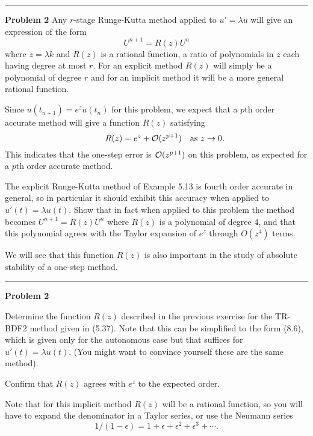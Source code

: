 \documentclass[10pt]{article}
\begin{document}


\vskip 1cm
\hrule
{\bf Problem 2}
Any $r$-stage Runge-Kutta method applied to $u'=\lambda u$ will give an
expression of the form
\[
U^{n+1} = R(z)U^n
\]
where $z=\lambda k$ and $R(z)$ is a rational function, a ratio of
polynomials in $z$ each having degree at most $r$.  For an explicit method
$R(z)$ will simply be a polynomial of degree $r$ and for an implicit method
it will be a more general rational function.

Since $u(t_{n+1}) = e^z u(t_n)$ for this problem, we expect that a $p$th
order accurate method will give a function $R(z)$ satisfying
\[
\qquad  R(z) = e^z + {\mathcal O}(z^{p+1}) \quad\text{as}~z \rightarrow 0.
\]
This indicates that the one-step error is ${\mathcal O}(z^{p+1})$ on this problem,
as expected for a $p$th order accurate method.

The explicit
Runge-Kutta method of Example 5.13 is fourth order accurate in general,
so in particular it should exhibit this accuracy when applied to 
$u'(t) = \lambda u(t)$.  Show that in fact when applied to this
problem the method becomes $U^{n+1} = R(z)U^n$ where $R(z)$ is 
a polynomial of degree 4, and that this polynomial agrees with the Taylor
expansion of $e^z$ through $O(z^4)$ terms.

We will see that this function $R(z)$ is also important in the study of 
absolute stability of a one-step method.



\vskip 1cm
\hrule
{\bf Problem 2}


Determine the function $R(z)$ described in the previous exercise for the
TR-BDF2 method given in (5.37).  Note that this can be simplified to the
form (8.6), which is given only for the autonomous case but that suffices
for $u'(t) = \lambda u(t)$.  (You might want to convince yourself these are 
the same method).

Confirm that $R(z)$ agrees with $e^z$ to the expected order.

Note that for this implicit method $R(z)$ will be a rational function, so you
will have to expand the denominator in a Taylor series, or use the Neumann
series 
\[
1/(1-\epsilon) = 1 + \epsilon + \epsilon^2 + \epsilon^3 + \cdots.
\]
\end{document}
